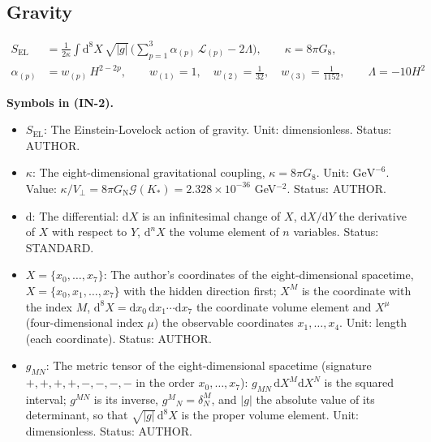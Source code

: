 \documentclass[
  10pt,
]{article}
\providecommand{\tightlist}{%
  \setlength{\itemsep}{0pt}\setlength{\parskip}{0pt}}
\begin{document}
\hypertarget{gravity}{%
\subsection{Gravity}\label{gravity}}

\[
\begin{aligned}
S_{\mathrm{EL}} &= \frac{1}{2\kappa}\int\mathrm{d}^8X\,\sqrt{\lvert g\rvert}\,
 \Big(\sum_{p=1}^{3}\alpha_{(p)}\,\mathcal{L}_{(p)} - 2\Lambda\Big),\qquad \kappa = 8\pi G_8,\\
\alpha_{(p)} &= w_{(p)}\,H^{2-2p},\qquad w_{(1)} = 1,\quad w_{(2)} = \frac{1}{32},\quad w_{(3)} =
 \frac{1}{1152},
 \qquad \Lambda = -10H^2
\end{aligned} \tag{IN-2}
\]

\textbf{Symbols in (IN-2).}

\begin{itemize}
\tightlist
\item
  \(S_{\mathrm{EL}}\): The Einstein-Lovelock action of gravity. Unit:
  dimensionless. Status: AUTHOR.
\item
  \(\kappa\): The eight-dimensional gravitational coupling,
  \(\kappa = 8\pi G_8\). Unit: \(\mathrm{GeV}^{-6}\). Value:
  \(\kappa/V_\perp = 8\pi G_{\mathrm{N}}\mathcal{G}(K_*) = 2.328\times10^{-36}\)
  GeV\(^{-2}\). Status: AUTHOR.
\item
  \(\mathrm{d}\): The differential: \(\mathrm{d}X\) is an infinitesimal
  change of \(X\), \(\mathrm{d}X/\mathrm{d}Y\) the derivative of \(X\)
  with respect to \(Y\), \(\mathrm{d}^nX\) the volume element of \(n\)
  variables. Status: STANDARD.
\item
  \(X = \{x_0, \dots, x_7\}\): The author's coordinates of the
  eight-dimensional spacetime, \(X = \{x_0, x_1, \dots, x_7\}\) with the
  hidden direction first; \(X^M\) is the coordinate with the index
  \(M\),
  \(\mathrm{d}^8X = \mathrm{d}x_0\,\mathrm{d}x_1\cdots\mathrm{d}x_7\)
  the coordinate volume element and \(X^\mu\) (four-dimensional index
  \(\mu\)) the observable coordinates \(x_1, \dots, x_4\). Unit: length
  (each coordinate). Status: AUTHOR.
\item
  \(g_{MN}\): The metric tensor of the eight-dimensional spacetime
  (signature \(+,+,+,+,-,-,-,-\) in the order \(x_0, \dots, x_7\)):
  \(g_{MN}\,\mathrm{d}X^M\mathrm{d}X^N\) is the squared interval;
  \(g^{MN}\) is its inverse, \(g^M{}_N = \delta^M_N\), and
  \(\lvert g\rvert\) the absolute value of its determinant, so that
  \(\sqrt{\lvert g\rvert}\,\mathrm{d}^8X\) is the proper volume element.
  Unit: dimensionless. Status: AUTHOR.

\end{itemize}
\end{document}
